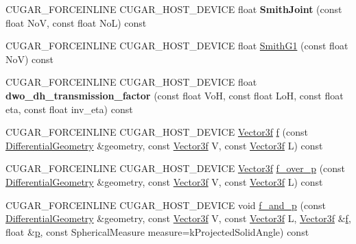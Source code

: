 \begin{DoxyCompactItemize}
\item 
\mbox{\label{structcugar_1_1_g_g_x_smith_bsdf_a801054079378b0d1bc0933fa87d9ae65}} 
C\+U\+G\+A\+R\+\_\+\+F\+O\+R\+C\+E\+I\+N\+L\+I\+NE C\+U\+G\+A\+R\+\_\+\+H\+O\+S\+T\+\_\+\+D\+E\+V\+I\+CE float {\bfseries Smith\+Joint} (const float NoV, const float NoL) const
\item 
C\+U\+G\+A\+R\+\_\+\+F\+O\+R\+C\+E\+I\+N\+L\+I\+NE C\+U\+G\+A\+R\+\_\+\+H\+O\+S\+T\+\_\+\+D\+E\+V\+I\+CE float \hyperlink{structcugar_1_1_g_g_x_smith_bsdf_a474b54da3eff2a3c9d62b9a8cc897480}{Smith\+G1} (const float NoV) const
\item 
\mbox{\label{structcugar_1_1_g_g_x_smith_bsdf_a09f3bc97196951e0a3a7b1c9a903402a}} 
C\+U\+G\+A\+R\+\_\+\+F\+O\+R\+C\+E\+I\+N\+L\+I\+NE C\+U\+G\+A\+R\+\_\+\+H\+O\+S\+T\+\_\+\+D\+E\+V\+I\+CE float {\bfseries dwo\+\_\+dh\+\_\+transmission\+\_\+factor} (const float VoH, const float LoH, const float eta, const float inv\+\_\+eta) const
\item 
C\+U\+G\+A\+R\+\_\+\+F\+O\+R\+C\+E\+I\+N\+L\+I\+NE C\+U\+G\+A\+R\+\_\+\+H\+O\+S\+T\+\_\+\+D\+E\+V\+I\+CE \hyperlink{structcugar_1_1_vector}{Vector3f} \hyperlink{structcugar_1_1_g_g_x_smith_bsdf_a3e1627dd2b69fe06049a8bffe695bf37}{f} (const \hyperlink{structcugar_1_1_differential_geometry}{Differential\+Geometry} \&geometry, const \hyperlink{structcugar_1_1_vector}{Vector3f} V, const \hyperlink{structcugar_1_1_vector}{Vector3f} L) const
\item 
C\+U\+G\+A\+R\+\_\+\+F\+O\+R\+C\+E\+I\+N\+L\+I\+NE C\+U\+G\+A\+R\+\_\+\+H\+O\+S\+T\+\_\+\+D\+E\+V\+I\+CE \hyperlink{structcugar_1_1_vector}{Vector3f} \hyperlink{structcugar_1_1_g_g_x_smith_bsdf_a3d429e534144823f363af47932e40d58}{f\+\_\+over\+\_\+p} (const \hyperlink{structcugar_1_1_differential_geometry}{Differential\+Geometry} \&geometry, const \hyperlink{structcugar_1_1_vector}{Vector3f} V, const \hyperlink{structcugar_1_1_vector}{Vector3f} L) const
\item 
C\+U\+G\+A\+R\+\_\+\+F\+O\+R\+C\+E\+I\+N\+L\+I\+NE C\+U\+G\+A\+R\+\_\+\+H\+O\+S\+T\+\_\+\+D\+E\+V\+I\+CE void \hyperlink{structcugar_1_1_g_g_x_smith_bsdf_a06f2287bfdfab8389a9cfb3234991001}{f\+\_\+and\+\_\+p} (const \hyperlink{structcugar_1_1_differential_geometry}{Differential\+Geometry} \&geometry, const \hyperlink{structcugar_1_1_vector}{Vector3f} V, const \hyperlink{structcugar_1_1_vector}{Vector3f} L, \hyperlink{structcugar_1_1_vector}{Vector3f} \&\hyperlink{structcugar_1_1_g_g_x_smith_bsdf_a3e1627dd2b69fe06049a8bffe695bf37}{f}, float \&\hyperlink{structcugar_1_1_g_g_x_smith_bsdf_a8cc733f9120c3b196b54a8df79116dfc}{p}, const Spherical\+Measure measure=k\+Projected\+Solid\+Angle) const

\end{DoxyCompactItemize}
